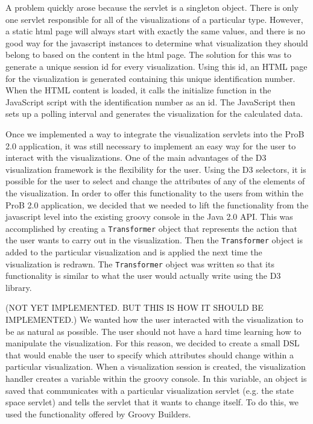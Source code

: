 A problem quickly arose because the servlet is a singleton object. There is only one servlet responsible for all of the visualizations of a particular type. However, a static html page will always start with exactly the same values, and there is no good way for the javascript instances to determine what visualization they should belong to based on the content in the html page. The solution for this was to generate a unique session id for every visualization. Using this id, an HTML page for the visualization is generated containing this unique identification number. When the HTML content is loaded, it calls the initialize function in the JavaScript script with the identification number as an id. The JavaScript then sets up a polling interval and generates the visualization for the calculated data.

Once we implemented a way to integrate the visualization servlets into the ProB 2.0 application, it was still necessary to implement an easy way for the user to interact with the visualizations. One of the main advantages of the D3 visualization framework is the flexibility for the user. Using the D3 selectors, it is possible for the user to select and change the attributes of any of the elements of the visualization. In order to offer this functionality to the users from within the ProB 2.0 application, we decided that we needed to lift the functionality from the javascript level into the existing groovy console in the Java 2.0 API. This was accomplished by creating a \texttt{Transformer} object that represents the action that the user wants to carry out in the visualization. Then the \texttt{Transformer} object is added to the particular visualization and is applied the next time the visualization is redrawn. The \texttt{Transformer} object was written so that its functionality is similar to what the user would actually write using the D3 library.

(NOT YET IMPLEMENTED. BUT THIS IS HOW IT SHOULD BE IMPLEMENTED.)
We wanted how the user interacted with the visualization to be as natural as possible. The user should not have a hard time learning how to manipulate the visualization. For this reason, we decided to create a small DSL that would enable the user to specify which attributes should change within a particular visualization. When a visualization session is created, the visualization handler creates a variable within the groovy console. In this variable, an object is saved that communicates with a particular visualization servlet (e.g. the state space servlet) and tells the servlet that it wants to change itself. To do this, we used the functionality offered by Groovy Builders.

